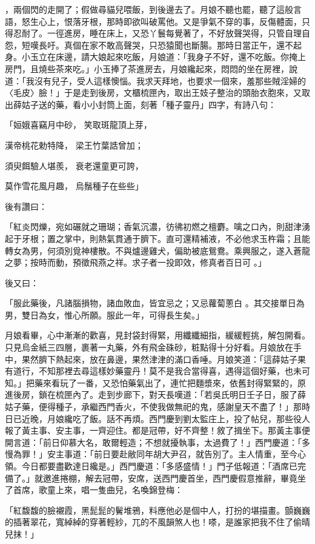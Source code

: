 ，兩個閃的走開了；假做尋貓兒喂飯，到後邊去了。月娘不聽也罷，聽了這般言語，怒生心上，恨落牙根，那時即欲叫破罵他。又是爭氣不穿的事，反傷體面，只得忍耐了。一徑進房，睡在床上，又恐丫鬟每覺著了，不好放聲哭得，只管自理自怨，短嘆長吁。真個在家不敢高聲哭，只恐猿聞也斷腸。那時日當正午，還不起身。小玉立在床邊，請大娘起來吃飯，月娘道：「我身子不好，還不吃飯。你掩上房門，且燒些茶來吃。」小玉捧了茶進房去，月娘纔起來，悶悶的坐在房裡，說道：「我沒有兒子，受人這樣懊惱。我求天拜地，也要求一個來，羞那些賊淫婦的〈毛皮〉臉！」于是走到後房，文櫃梳匣內，取出王妓子整治的頭胎衣胞來，又取出薛姑子送的藥，看小小封筒上面，刻著「種子靈丹」四字，有詩八句：

「姮娥喜竊月中砂，  笑取斑龍頂上芽，

漢帝桃花勅特降，  梁王竹葉誥曾加；

須臾餌驗人堪羨，  衰老還童更可誇，

莫作雪花風月趣，  烏鬚種子在些些」

後有讚曰：

「紅炎閃爍，宛如碾就之珊瑚；香氣沉濃，彷彿初燃之檀麝。噙之口內，則甜津湧起于牙根；置之掌中，則熱氣貫通于臍下。直可還精補液，不必他求玉杵霜；且能轉女為男，何須別覓神樓散。不與爐邊雞犬，偏助被底鴛鴦。乘興服之，遂入蒼龍之夢；按時而動，預徵飛燕之祥。求子者一投即效，修真者百日可 。」

後又曰：

「服此藥後，凡諸腦損物，諸血敗血，皆宜忌之；又忌蘿蔔蔥白 。其交接單日為男，雙日為女，惟心所願。服此一年，可得長生矣。」

月娘看畢，心中漸漸的歡喜，見封袋封得緊，用纖纖細指，緩緩輕挑，解包開看。只見烏金紙三四層，裹著一丸藥，外有飛金硃砂，粧點得十分好看。月娘放在手中，果然臍下熱起來，放在鼻邊，果然津津的滿口香唾。月娘笑道：「這薛姑子果有道行，不知那裡去尋這樣妙藥靈丹！莫不是我合當得喜，遇得這個好藥，也未可知。」把藥來看玩了一番，又恐怕藥氣出了，連忙把麵漿來，依舊封得緊緊的，原進後房，鎖在梳匣內了。走到步廊下，對天長嘆道：「若吳氏明日壬子日，服了薛姑子藥，便得種子，承繼西門香火，不使我做無祀的鬼，感謝皇天不盡了！」那時日已近晚，月娘纔吃了飯。話不再煩。西門慶到劉太監庄上，投了帖兒，那些役人報了黃主事、安主事，一齊迎住。都是冠帶，好不齊整！敘了揖坐下。那黃主事便開言道：「前日仰慕大名，敢爾輕造；不想就擾執事，太過費了！」西門慶道：「多慢為罪！」安主事道：「前日要赴敝同年胡大尹召，就告別了。主人情重，至今心領。今日都要盡歡達日纔是。」西門慶道：「多感盛情！」門子低報道：「酒席已完備了。」就邀進捲棚，解去冠帶，安席，送西門慶首坐，西門慶假意推辭，畢竟坐了首席，歌童上來，唱一隻曲兒，名喚錦登梅：

「紅馥馥的臉襯霞，黑髭髭的鬢堆鴉，料應他必是個中人，打扮的堪描畫。顫巍巍的插著翠花，寬綽綽的穿著輕紗，兀的不風韻煞人也！嗏，是誰家把我不住了偷晴兒抹！」

